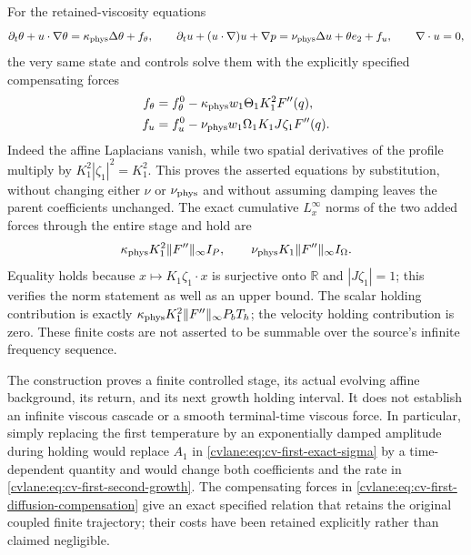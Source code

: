 For the retained-viscosity equations
\[
 \partial_t\theta+u\cdot\nabla\theta
     =\kappa_{\rm phys}\Delta\theta+f_\theta,\qquad
 \partial_tu+(u\cdot\nabla)u+\nabla p
     =\nu_{\rm phys}\Delta u+\theta e_2+f_u,
 \qquad\nabla\cdot u=0,
\]
the very same state and controls solve them with the explicitly
specified compensating forces
\begin{align}
 f_\theta&=f_\theta^0
 -\kappa_{\rm phys}w_1\Theta_1K_1^2F''(q),\nonumber\\
 f_u&=f_u^0-\nu_{\rm phys}w_1\Omega_1K_1J\zeta_1F''(q).
 \label{cvlane:eq:cv-first-diffusion-compensation}
\end{align}
Indeed the affine Laplacians vanish, while two spatial derivatives
of the profile multiply by $K_1^2|\zeta_1|^2=K_1^2$.
This proves the asserted equations by substitution, without changing
either $\nu$ or $\nu_{\rm phys}$ and without assuming damping leaves
the parent coefficients unchanged. The exact cumulative $L^\infty_x$
norms of the two added forces through the entire stage and hold are
\begin{equation}
 \kappa_{\rm phys}K_1^2\|F''\|_\infty I_P,
 \qquad
 \nu_{\rm phys}K_1\|F''\|_\infty I_\Omega.
 \label{cvlane:eq:cv-first-exact-diffusion-cost}
\end{equation}
Equality holds because $x\mapsto K_1\zeta_1\cdot x$ is surjective
onto $\mathbb R$ and $|J\zeta_1|=1$; this verifies the norm statement
as well as an upper bound. The scalar holding contribution is exactly
$\kappa_{\rm phys}K_1^2\|F''\|_\infty P_bT_h$; the velocity holding
contribution is zero. These finite costs are not asserted to be
summable over the source's infinite frequency sequence.

The construction proves a finite controlled stage, its actual evolving
affine background, its return, and its next growth holding interval.
It does not establish an infinite viscous cascade or a smooth
terminal-time viscous force. In particular, simply replacing the
first temperature by an exponentially damped amplitude during holding
would replace $A_1$ in \eqref{cvlane:eq:cv-first-exact-sigma} by a
time-dependent quantity and would change both coefficients and the
rate in \eqref{cvlane:eq:cv-first-second-growth}. The compensating forces
in \eqref{cvlane:eq:cv-first-diffusion-compensation} give an exact specified
relation that retains the original coupled finite trajectory; their
costs have been retained explicitly rather than claimed negligible.


